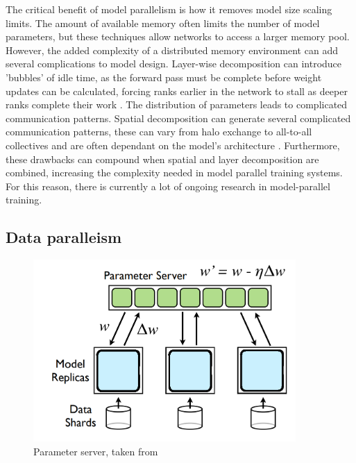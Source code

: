The critical benefit of model parallelism is how it removes model size scaling limits.
The amount of available memory often limits the number of model parameters, but these techniques allow networks to access a larger memory pool. 
However, the added complexity of a distributed memory environment can add several complications to model design. 
Layer-wise decomposition can introduce 'bubbles' of idle time, as the forward pass must be complete before weight updates can be calculated, forcing ranks earlier in the network to stall as deeper ranks complete their work \cite{Huang2019Gpipe}.
The distribution of parameters leads to complicated communication patterns.
Spatial decomposition can generate several complicated communication patterns, these can vary from halo exchange to all-to-all collectives and are often dependant on the model's architecture \cite{Coates2013DLwithCOTSHPC, Dryden2019ImprvScaleofCNN}.
Furthermore, these drawbacks can compound when spatial and layer decomposition are combined, increasing the complexity needed in model parallel training systems.
For this reason, there is currently a lot of ongoing research in model-parallel training.

\subsection{Data paralleism}
\begin{figure}
    \centering
    \includegraphics[width=10cm]{3_Chapters/3_Chapter_DistributedDL/Figs/parameter_server.png}
    \caption{Parameter server, taken from \cite{Dean2012DistBelif}}
    \label{fig:parameter-server}
\end{figure}

